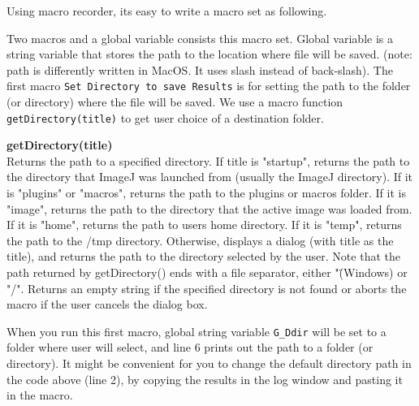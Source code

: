 \documentclass[11pt,a4paper,oneside]{report}
\newenvironment{indentCom}%
{\begin{list}{}%
         {\setlength{\leftmargin}{1em}}%
         \item[]%
}
{\end{list}}
\newcommand{\ilcom}[1]{\texttt{\small#1}}
\begin{document}
Using macro recorder, its easy to write a macro set as following. 



Two macros and a global variable consists this macro set. 
Global variable is a string variable that stores the path to the location where file will be saved. 
(note: path is differently written in MacOS. It uses slash instead of back-slash). 
The first macro \ilcom{Set Directory to save Results} is for setting the path to the folder 
(or directory) where the file will be saved. 
We use a macro function \ilcom{getDirectory(title)} to get user choice of a destination folder. 

\begin{indentCom}
\textbf{getDirectory(title)}\\
Returns the path to a specified directory. If title is "startup", returns the path to the directory 
that ImageJ was launched from (usually the ImageJ directory). If it is "plugins" or 
"macros", returns the path to the plugins or macros folder. If it is "image", 
returns the path to the directory that the active image was loaded from. 
If it is "home", returns the path to users home directory. 
If it is "temp", returns the path to the /tmp directory. 
Otherwise, displays a dialog (with title as the title), 
and returns the path to the directory selected by the user. 
Note that the path returned by getDirectory() ends with a file separator, 
either "\" (Windows) or "/". Returns an empty string if the specified directory is not found or 
aborts the macro if the user cancels the dialog box.
\end{indentCom}

When you run this first macro, global string variable \ilcom{G\_Ddir} 
will be set to a folder where user will select, and line 6 prints out the path to 
a folder (or directory). It might be convenient for you to change the default directory path 
in the code above (line 2), by copying the results in the log window and pasting it in the macro. 
\end{document}
